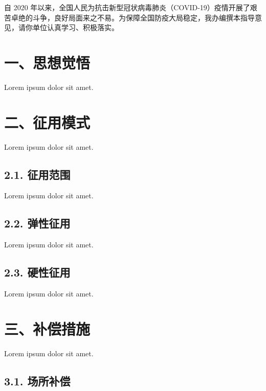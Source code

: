 



\pagestyle{plain}
\rmfamily
\normalsize
\raggedbottom



\vspace{20pt}

自 2020 年以来，全国人民为抗击新型冠状病毒肺炎（COVID-19）疫情开展了艰苦卓绝的斗争，良好局面来之不易。为保障全国防疫大局稳定，我办编撰本指导意见，请你单位认真学习、积极落实。

\section*{一、思想觉悟}

Lorem ipsum dolor sit amet.

\section*{二、征用模式}

Lorem ipsum dolor sit amet.

\subsection*{2.1. 征用范围}

Lorem ipsum dolor sit amet.

\subsection*{2.2. 弹性征用}

Lorem ipsum dolor sit amet.

\subsection*{2.3. 硬性征用}

Lorem ipsum dolor sit amet.

\section*{三、补偿措施}

Lorem ipsum dolor sit amet.

\subsection*{3.1. 场所补偿}

